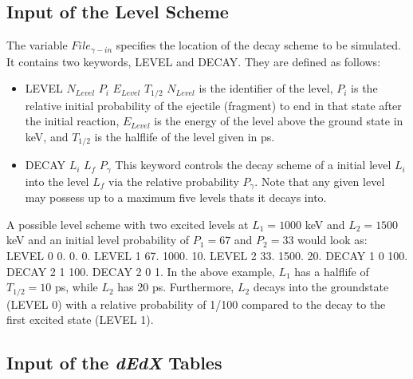 \documentclass[12pt]{book}
\begin{document}
\subsection{Input of the Level Scheme}

The variable $File_{\gamma-in}$ specifies the location of the decay scheme to be simulated. It contains
two keywords, {\ttfamily LEVEL} and {\ttfamily DECAY}. They are defined as follows:

\begin{itemize}
\item LEVEL $N_{Level}$ $P_{i}$ $E_{Level}$ $T_{1/2}$\hfill{} \linebreak
 $N_{Level}$ is the identifier of the level, $P_{i}$ is the relative initial probability 
  of the ejectile (fragment) to end
  in that state after the initial reaction, $E_{Level}$ is the energy of the level 
  above the ground state in keV, and $T_{1/2}$ is the halflife of the level given in ps.
\item DECAY $L_{i}$ $L_{f}$ $P_{\gamma}$\hfill{} \linebreak
  This keyword controls the decay scheme of a initial level $L_{i}$ into the level $L_{f}$ via the relative probability
  $P_{\gamma}$. Note that any given level may possess up to a maximum five levels thats it decays into.
\end{itemize}

A possible level scheme with two excited levels at $L_{1}= 1000$ keV and $L_{2}= 1500$ keV and an initial level 
probability of $P_{1}= 67$ and $P_{2}= 33$ would look as:\hfill{}
\linebreak
\linebreak
{\ttfamily
  LEVEL  0  0.  0. 0.\linebreak
  LEVEL  1  67. 1000. 10. \linebreak
  LEVEL  2  33. 1500. 20.\linebreak
  DECAY  1  0 100.\linebreak
  DECAY  2  1 100.\linebreak
  DECAY  2  0   1.\linebreak
}
\linebreak
\linebreak
In the above example, $L_{1}$ has a halflife of $T_{1/2} = 10$ ps, while $L_{2}$ has 20 ps. Furthermore, $L_{2}$
decays into the groundstate (LEVEL 0) with a relative probability of 1/100 compared to the decay to 
the first excited state (LEVEL 1).  

\subsection{Input of the \textit{dEdX} Tables}
\end{document}
